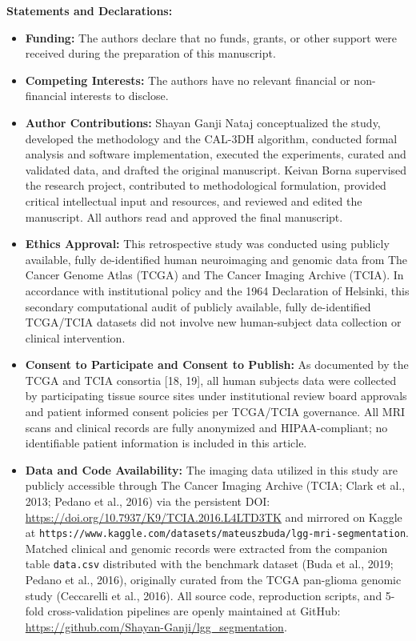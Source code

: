 \documentclass[10pt]{article}
\begin{document}
\vspace{0.2em}
\noindent\textbf{Statements and Declarations:}
\begin{itemize}\setlength{\itemsep}{1pt}\setlength{\parsep}{0pt}\setlength{\parskip}{0pt}\footnotesize
    \item \textbf{Funding:} The authors declare that no funds, grants, or other support were received during the preparation of this manuscript.
    \item \textbf{Competing Interests:} The authors have no relevant financial or non-financial interests to disclose.
    \item \textbf{Author Contributions:} Shayan Ganji Nataj conceptualized the study, developed the methodology and the CAL-3DH algorithm, conducted formal analysis and software implementation, executed the experiments, curated and validated data, and drafted the original manuscript. Keivan Borna supervised the research project, contributed to methodological formulation, provided critical intellectual input and resources, and reviewed and edited the manuscript. All authors read and approved the final manuscript.
    \item \textbf{Ethics Approval:} This retrospective study was conducted using publicly available, fully de-identified human neuroimaging and genomic data from The Cancer Genome Atlas (TCGA) and The Cancer Imaging Archive (TCIA). In accordance with institutional policy and the 1964 Declaration of Helsinki, this secondary computational audit of publicly available, fully de-identified TCGA/TCIA datasets did not involve new human-subject data collection or clinical intervention.
    \item \textbf{Consent to Participate and Consent to Publish:} As documented by the TCGA and TCIA consortia [18, 19], all human subjects data were collected by participating tissue source sites under institutional review board approvals and patient informed consent policies per TCGA/TCIA governance. All MRI scans and clinical records are fully anonymized and HIPAA-compliant; no identifiable patient information is included in this article.
    \item \textbf{Data and Code Availability:} The imaging data utilized in this study are publicly accessible through The Cancer Imaging Archive (TCIA; Clark et al., 2013; Pedano et al., 2016) via the persistent DOI: \url{https://doi.org/10.7937/K9/TCIA.2016.L4LTD3TK} and mirrored on Kaggle at \texttt{https://www.kaggle.com/datasets/mateuszbuda/lgg-mri-segmentation}. Matched clinical and genomic records were extracted from the companion table \texttt{data.csv} distributed with the benchmark dataset (Buda et al., 2019; Pedano et al., 2016), originally curated from the TCGA pan-glioma genomic study (Ceccarelli et al., 2016). All source code, reproduction scripts, and 5-fold cross-validation pipelines are openly maintained at GitHub: \url{https://github.com/Shayan-Ganji/lgg_segmentation}.
\end{itemize}
\end{document}
